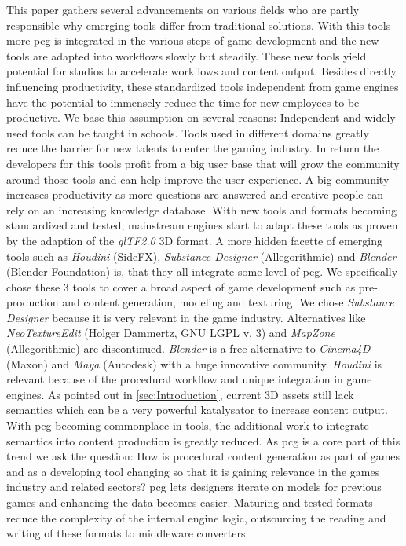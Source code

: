 \documentclass[10pt,a4paper]{article}
\begin{document}
\begin{multicols}{2}
This paper gathers several advancements on various fields who are partly responsible why emerging tools differ from traditional solutions. With this tools more \gls{pcg} is integrated in the various steps of game development and the new tools are adapted into workflows slowly but steadily. These new tools yield potential for studios to accelerate workflows and content output. Besides directly influencing productivity, these standardized tools independent from game engines have the potential to immensely reduce the time for new employees to be productive. We base this assumption on several reasons: Independent and widely used tools can be taught in schools. Tools used in different domains greatly reduce the barrier for new talents to enter the gaming industry. In return the developers for this tools profit from a big user base that will grow the community around those tools and can help improve the user experience. A big community increases productivity as more questions are answered and creative people can rely on an increasing knowledge database. With new tools and formats becoming standardized and tested, mainstream engines start to adapt these tools as proven by the adaption of the \textit{glTF2.0} 3D format\cite{Group2018}. A more hidden facette of emerging tools such as \textit{Houdini} (SideFX), \textit{Substance Designer} (Allegorithmic) and \textit{Blender} (Blender Foundation) is, that they all integrate some level of \gls{pcg}. We specifically chose these 3 tools to cover a broad aspect of game development such as pre-production and content generation, modeling and texturing. We chose \textit{Substance Designer} because it is very relevant in the game industry. Alternatives like \textit{NeoTextureEdit} (Holger Dammertz, GNU LGPL v. 3) and \textit{MapZone} (Allegorithmic) are discontinued. \textit{Blender} is a free alternative to \textit{Cinema4D} (Maxon) and \textit{Maya} (Autodesk) with a huge innovative community. \textit{Houdini} is relevant because of the procedural workflow and unique integration in game engines. As pointed out in \autoref{sec:Introduction}, current 3D assets still lack semantics which can be a very powerful katalysator to increase content output. With \gls{pcg} becoming commonplace in tools, the additional work to integrate semantics into content production is greatly reduced. As \gls{pcg} is a core part of this trend we ask the question: How is procedural content generation as part of games and as a developing tool changing so that it is gaining relevance in the games industry and related sectors? \gls{pcg} lets designers iterate on models for previous games and enhancing the data becomes easier. Maturing and tested formats reduce the complexity of the internal engine logic, outsourcing the reading and writing of these formats to middleware converters.
\end{multicols}
\end{document}
